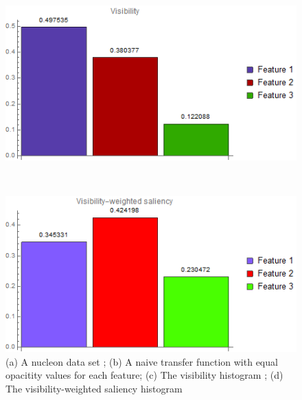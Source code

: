 \begin{figure}
\begin{minipage}{.15\textwidth}
	\subcaption{}
\end{minipage}~
\begin{minipage}{.25\textwidth}
	\includegraphics[width=1\linewidth]{images/nucleon_naive_visibility_chart}
	\subcaption{}
\end{minipage}~
\begin{minipage}{.25\textwidth}
	\includegraphics[width=1\linewidth]{images/nucleon_naive_visibility_saliency_weighted_chart}
	\subcaption{}
\end{minipage}
\caption{(a) A nucleon data set \cite{website:Voreen_datasets_2013}; (b) A naive transfer function with equal opacitity values for each feature; (c) The visibility histogram \cite{wang_efficient_2011}; (d) The visibility-weighted saliency histogram}
\label{fig:nucleon_naive}
\end{figure}

